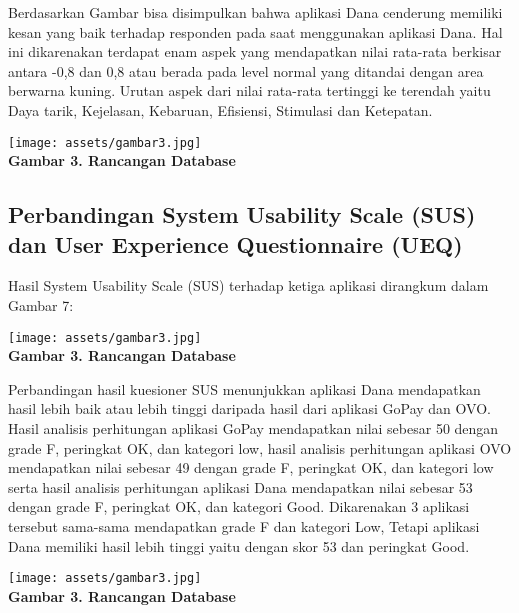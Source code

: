 \documentclass[
 manuscript=article,  %
  layout=publish, 
  year=2024, 
  month= Februari, %
  volume=8,
  number=1 
]{JIKO}
\begin{document}
Berdasarkan Gambar  bisa disimpulkan bahwa aplikasi Dana cenderung memiliki kesan yang baik terhadap responden pada saat menggunakan aplikasi Dana. Hal ini dikarenakan terdapat enam aspek yang mendapatkan nilai rata-rata berkisar antara -0,8 dan 0,8 atau berada pada level normal yang ditandai dengan area berwarna kuning. Urutan aspek dari nilai rata-rata tertinggi ke terendah yaitu Daya tarik, Kejelasan, Kebaruan, Efisiensi, Stimulasi dan Ketepatan.
\begin{center}
    \texttt{[image: assets/gambar3.jpg]}
    \\\textbf{Gambar 3. Rancangan Database}
\end{center}

\subsection{Perbandingan System Usability Scale (SUS) dan User Experience Questionnaire (UEQ)}
Hasil System Usability Scale (SUS) terhadap ketiga aplikasi dirangkum dalam Gambar 7: 
\begin{center}
    \texttt{[image: assets/gambar3.jpg]}
    \\\textbf{Gambar 3. Rancangan Database}
\end{center}


Perbandingan hasil kuesioner SUS menunjukkan aplikasi Dana mendapatkan hasil lebih baik atau lebih tinggi daripada hasil dari aplikasi GoPay dan OVO. Hasil analisis perhitungan aplikasi GoPay mendapatkan nilai sebesar 50 dengan grade F, peringkat OK, dan kategori low, hasil analisis perhitungan aplikasi OVO mendapatkan nilai sebesar 49 dengan grade F, peringkat OK, dan kategori low serta hasil analisis perhitungan aplikasi Dana mendapatkan nilai sebesar 53 dengan grade F, peringkat OK, dan kategori Good. Dikarenakan 3 aplikasi tersebut sama-sama mendapatkan grade F dan kategori Low, Tetapi aplikasi Dana memiliki hasil lebih tinggi yaitu dengan skor 53 dan peringkat Good.

\begin{center}
    \texttt{[image: assets/gambar3.jpg]}
    \\\textbf{Gambar 3. Rancangan Database}
\end{center}
\end{document}
